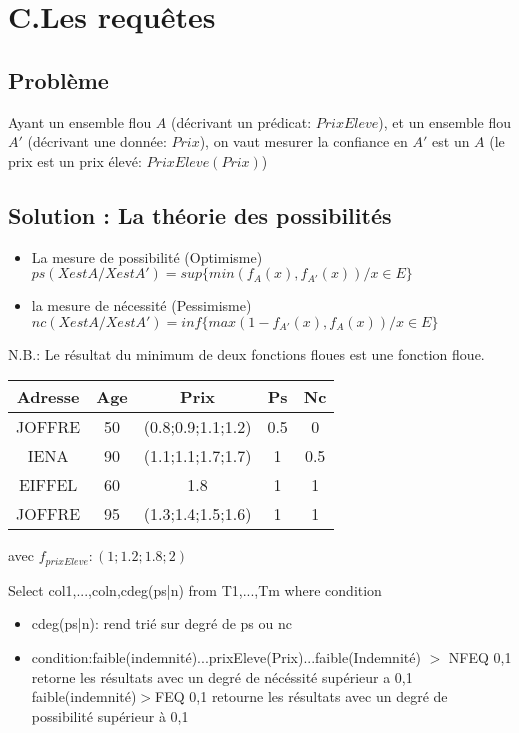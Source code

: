 \documentclass[a4paper,11pt]{article}
\begin{document}
\section{C.Les requêtes}
\subsection{Problème}

Ayant un ensemble flou $ A $ (décrivant un prédicat: $PrixEleve$), et un ensemble flou $ A' $   (décrivant une donnée: $Prix$), on vaut mesurer la confiance en  $ A' $ est un $ A $ (le prix est un prix élevé: $PrixEleve(Prix)$)

\subsection{Solution : La théorie des possibilités}
\begin{itemize}
\item La mesure de possibilité (Optimisme)\\
$ ps(X est A / Xest A')=sup\{min(f_A(x),f_{A'}(x)) / x \in E\} $
\item la mesure de nécessité (Pessimisme)\\
$ nc(X est A / X est A')=inf \{max(1-f_{A'}(x), f_A(x)) / x \in E\} $
\end{itemize}
N.B.: Le résultat du minimum de deux fonctions floues est une fonction floue.
\begin{center}
\begin{tabular}{|c|c|c|c|c|}
\hline 
Adresse & Age & Prix & Ps & Nc \\ 
\hline 
JOFFRE & 50 & (0.8;0.9;1.1;1.2) & 0.5 & 0 \\ 
\hline 
IENA & 90 & (1.1;1.1;1.7;1.7) & 1 & 0.5  \\ 
\hline 
EIFFEL & 60 & 1.8 & 1 & 1  \\ 
\hline 
JOFFRE & 95 & (1.3;1.4;1.5;1.6) & 1 & 1  \\ 
\hline 
\end{tabular} 
\end{center}
avec $f_{prixEleve}:(1;1.2;1.8;2)$


Select col1,...,coln,cdeg(ps|n)
from T1,...,Tm
where condition

\begin{itemize}
\item cdeg(ps|n): rend trié sur degré de ps ou nc
\item condition:faible(indemnité)...prixEleve(Prix)...faible(Indemnité) $>$ NFEQ 0,1 retorne les résultats avec un degré de nécéssité supérieur a 0,1\\
faible(indemnité)$>$FEQ 0,1 retourne les résultats avec un degré de possibilité supérieur à 0,1
\end{itemize}
\end{document}
